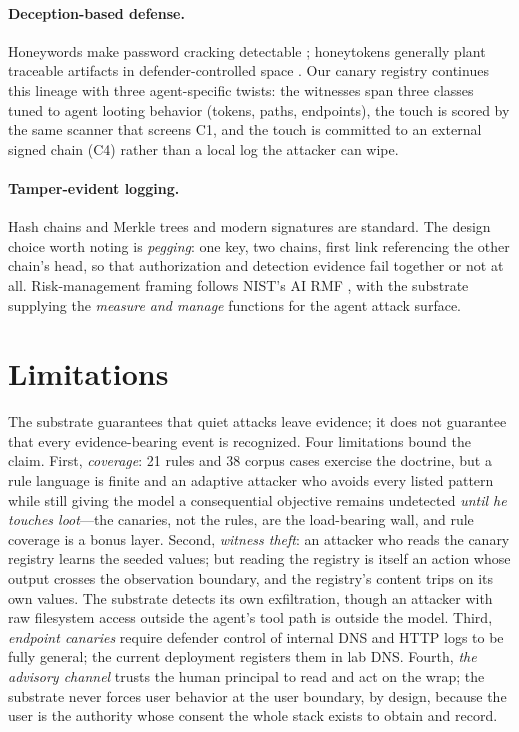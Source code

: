\documentclass[11pt,a4paper]{article}
\begin{document}
\paragraph{Deception-based defense.} Honeywords make password cracking
detectable \cite{honeywords}; honeytokens generally plant traceable
artifacts in defender-controlled space \cite{spitzner}. Our canary
registry continues this lineage with three agent-specific twists: the
witnesses span three classes tuned to agent looting behavior (tokens,
paths, endpoints), the touch is scored by the same scanner that screens
C1, and the touch is committed to an external signed chain (C4) rather
than a local log the attacker can wipe.

\paragraph{Tamper-evident logging.} Hash chains and Merkle trees
\cite{merkle} and modern signatures \cite{ed25519} are standard. The
design choice worth noting is \emph{pegging}: one key, two chains, first
link referencing the other chain's head, so that authorization and
detection evidence fail together or not at all. Risk-management framing
follows NIST's AI RMF \cite{nist}, with the substrate supplying the
\emph{measure and manage} functions for the agent attack surface.

\needspace{0.22\textheight}
\section{Limitations}\label{sec:limits}

The substrate guarantees that quiet attacks leave evidence; it does not
guarantee that every evidence-bearing event is recognized. Four
limitations bound the claim. First, \emph{coverage}: 21 rules and 38
corpus cases exercise the doctrine, but a rule language is finite and an
adaptive attacker who avoids every listed pattern while still giving the
model a consequential objective remains undetected \emph{until he touches
loot}---the canaries, not the rules, are the load-bearing wall, and rule
coverage is a bonus layer. Second, \emph{witness theft}: an attacker who
reads the canary registry learns the seeded values; but reading the
registry is itself an action whose output crosses the observation
boundary, and the registry's content trips on its own values. The
substrate detects its own exfiltration, though an attacker with raw
filesystem access outside the agent's tool path is outside the model.
Third, \emph{endpoint canaries} require defender control of internal DNS
and HTTP logs to be fully general; the current deployment registers them
in lab DNS. Fourth, \emph{the advisory channel} trusts the human
principal to read and act on the wrap; the substrate never forces user
behavior at the user boundary, by design, because the user is the
authority whose consent the whole stack exists to obtain and record.
\end{document}
